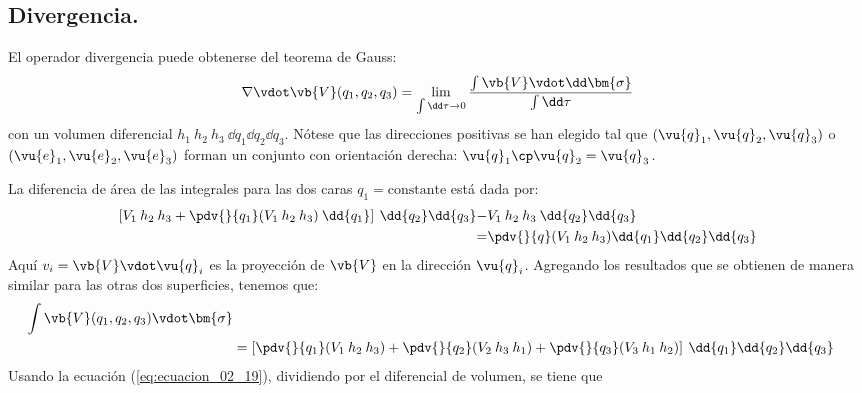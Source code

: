 \subsection{Divergencia.}
El operador divergencia puede obtenerse del teorema de Gauss:
\begin{equation}
\nabla \vdot \vb{V}(q_{1}, q_{2}, q_{3}) = \lim_{\int \dd \tau \to 0} \dfrac{\int \vb{V} \vdot \dd \bm{\sigma}}{\int \dd \tau}
\label{eq:ecuacion_02_19}
\end{equation}
con un volumen diferencial $h_{1} \: h_{2} \: h_{3} \: \dd{q_{1}} \dd{q_{2}} \dd{q_{3}}$.
Nótese que las direcciones positivas se han elegido tal que $(\vu{q}_{1}, \vu{q}_{2}, \vu{q}_{3})$ o $(\vu{e}_{1},\vu{e}_{2}, \vu{e}_{3})$ forman un conjunto con orientación derecha: $\vu{q}_{1} \cp \vu{q}_{2} = \vu{q}_{3}$.
\par
La diferencia de área de las integrales para las dos caras $q_{1} = \text{constante}$ está dada por:
\begin{align}
\begin{aligned}
\left[ V_{1} \: h_{2} \: h_{3} + \pdv{}{q_{1}} (V_{1} \: h_{2} \: h_{3}) \: \dd{q_{1}} \right] \: \dd{q_{2}} \dd{q_{3}} -& V_{1} \: h_{2} \: h_{3} \: \dd{q_{2}} \dd{q_{3}} \\
=& \pdv{}{q} (V_{1} \: h_{2} \: h_{3}) \dd{q_{1}} \dd{q_{2}} \dd{q_{3}}
\end{aligned}
\label{eq:ecuacion_02_20}
\end{align}
Aquí  $v_{i} = \vb{V} \vdot \vu{q}_{i}$ es la proyección de $\vb{V}$ en la dirección  $\vu{q}_{i}$. Agregando los resultados que se obtienen de manera similar para las otras dos superficies, tenemos que:
\begin{align}
\begin{aligned}
\int \vb{V}(q_{1}, q_{2}, q_{3}) \vdot \bm{\sigma}  \\
&= \left[ \pdv{}{q_{1}} (V_{1} \: h_{2} \: h_{3}) + \pdv{}{q_{2}} (V_{2} \: h_{3} \: h_{1}) +
\pdv{}{q_{3}} (V_{3} \: h_{1} \: h_{2}) \right] \: \dd{q_{1}} \dd{q_{2}} \dd{q_{3}}
\end{aligned}
\end{align}
Usando la ecuación (\ref{eq:ecuacion_02_19}), dividiendo por el diferencial de volumen, se tiene que
